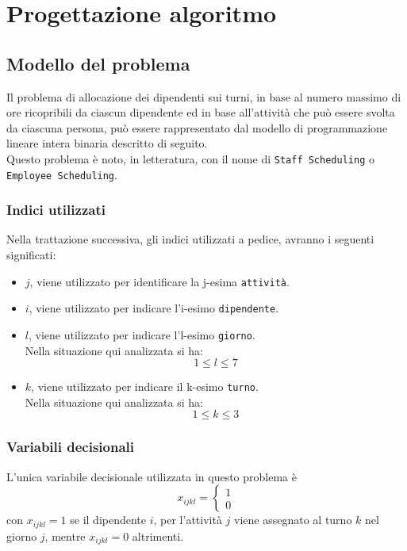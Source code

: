 \chapter{Progettazione algoritmo}
\section{Modello del problema}
Il problema di allocazione dei dipendenti sui turni, in base al numero massimo di ore ricopribili da ciascun dipendente ed in base all'attività che può essere svolta da ciascuna persona, può essere rappresentato dal modello di programmazione lineare intera binaria descritto di seguito.\\

\noindent
Questo problema è noto, in letteratura, con il nome di \verb|Staff Scheduling| o \verb|Employee Scheduling|.
\subsection{Indici utilizzati}
Nella trattazione successiva, gli indici utilizzati a pedice, avranno i seguenti significati:
\begin{itemize}
	\item $j$, viene utilizzato per identificare la j-esima \verb|attività|.
	\item $i$, viene utilizzato per indicare l'i-esimo \verb|dipendente|.
	\item $l$, viene utilizzato per indicare l'l-esimo \verb|giorno|.\\
		Nella situazione qui analizzata si ha:
		\begin{equation}
			1 \leq l \leq 7
		\end{equation}
	\item $k$, viene utilizzato per indicare il k-esimo \verb|turno|.\\
		Nella situazione qui analizzata si ha:
		\begin{equation}
			1 \leq k \leq 3
		\end{equation}
\end{itemize}
\subsection{Variabili decisionali}
L'unica variabile decisionale utilizzata in questo problema è
\begin{equation}
	x_{ijkl} =
	\begin{cases}
		1\\
		0
	\end{cases}
\end{equation}
con $x_{ijkl} = 1$ se il dipendente $i$, per l'attività $j$ viene assegnato al turno $k$ nel giorno $j$, mentre $x_{ijkl} = 0$ altrimenti.
